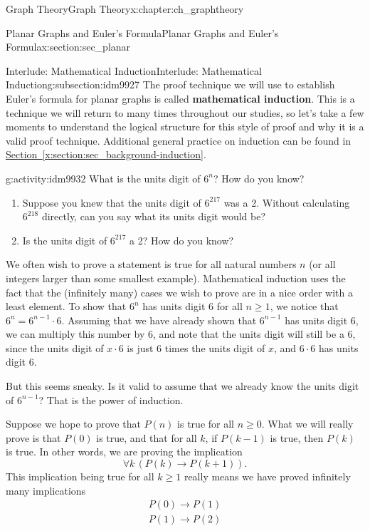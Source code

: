 \documentclass[oneside,10pt,]{book}
\newcommand{\terminology}[1]{\textbf{#1}}
\numberwithin{equation}{chapter}
\def\imp{\rightarrow}
\begin{document}
\begin{chapterptx}{Graph Theory}{}{Graph Theory}{}{}{x:chapter:ch_graphtheory}
\begin{sectionptx}{Planar Graphs and Euler's Formula}{}{Planar Graphs and Euler's Formula}{}{}{x:section:sec_planar}
\begin{subsectionptx}{Interlude: Mathematical Induction}{}{Interlude: Mathematical Induction}{}{}{g:subsection:idm9927}
The proof technique we will use to establish Euler's formula for planar graphs is called \terminology{mathematical induction}.  This is a technique we will return to many times throughout our studies, so let's take a few moments to understand the logical structure for this style of proof and why it is a valid proof technique.  Additional general practice on induction can be found in \hyperref[x:section:sec_background-induction]{Section~\ref{x:section:sec_background-induction}}.%
\begin{activity}{}{g:activity:idm9932}%
What is the units digit of \(6^n\)?  How do you know?%
\begin{enumerate}[font=\bfseries,label=(\alph*),ref=\alph*]
\item{}Suppose you knew that the units digit of \(6^{217}\) was a 2.  Without calculating \(6^{218}\) directly, can you say what its units digit would be?%
\item{}Is the units digit of \(6^{217}\) a 2?  How do you know?%
\end{enumerate}
\end{activity}
We often wish to prove a statement is true for all natural numbers \(n\) (or all integers larger than some smallest example).  Mathematical induction uses the fact that the (infinitely many) cases we wish to prove are in a nice order with a least element.  To show that \(6^n\) has units digit 6 for all \(n \ge 1\), we notice that \(6^n = 6^{n-1}\cdot 6\).  Assuming that we have already shown that \(6^{n-1}\) has units digit 6, we can multiply this number by 6, and note that the units digit will still be a 6, since the units digit of \(x \cdot 6\) is just 6 times the units digit of \(x\), and \(6\cdot 6\) has units digit 6.%
\par
But this seems sneaky.  Is it valid to assume that we already know the units digit of \(6^{n-1}\)?  That is the power of induction.%
\par
Suppose we hope to prove that \(P(n)\) is true for all \(n \ge 0\).  What we will really prove is that \(P(0)\) is true, and that for all \(k\), if \(P(k-1)\) is true, then \(P(k)\) is true.  In other words, we are proving the implication%
\begin{equation*}
\forall k \,(P(k) \imp P(k+1)).
\end{equation*}
This implication being true for all \(k \ge 1\) really means we have proved infinitely many implications%
\begin{gather*}
P(0) \imp P(1)\\
P(1) \imp P(2)\\

\end{gather*}
\end{subsectionptx}
\end{sectionptx}
\end{chapterptx}
\end{document}
